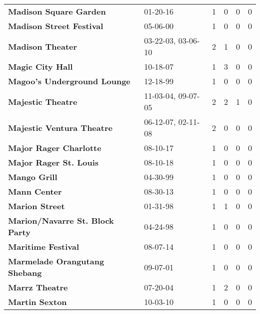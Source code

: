 \begin{supertabular}{p{0.4\textwidth}p{0.3\textwidth}p{0.05\textwidth}p{0.05\textwidth}p{0.05\textwidth}p{0.05\textwidth}}
                                       \textbf{Madison Square Garden} &            01-20-16 &  1 &  0 &  0 &  0 \\
                                     \textbf{Madison Street Festival} &            05-06-00 &  1 &  0 &  0 &  0 \\
                                             \textbf{Madison Theater} &  03-22-03, 03-06-10 &  2 &  1 &  0 &  0 \\
                                             \textbf{Magic City Hall} &            10-18-07 &  1 &  3 &  0 &  0 \\
                                  \textbf{Magoo's Underground Lounge} &            12-18-99 &  1 &  0 &  0 &  0 \\
                                            \textbf{Majestic Theatre} &  11-03-04, 09-07-05 &  2 &  2 &  1 &  0 \\
                                    \textbf{Majestic Ventura Theatre} &  06-12-07, 02-11-08 &  2 &  0 &  0 &  0 \\
                                       \textbf{Major Rager Charlotte} &            08-10-17 &  1 &  0 &  0 &  0 \\
                                       \textbf{Major Rager St. Louis} &            08-10-18 &  1 &  0 &  0 &  0 \\
                                                 \textbf{Mango Grill} &            04-30-99 &  1 &  0 &  0 &  0 \\
                                                 \textbf{Mann Center} &            08-30-13 &  1 &  0 &  0 &  0 \\
                                               \textbf{Marion Street} &            01-31-98 &  1 &  1 &  0 &  0 \\
                              \textbf{Marion/Navarre St. Block Party} &            04-24-98 &  1 &  0 &  0 &  0 \\
                                           \textbf{Maritime Festival} &            08-07-14 &  1 &  0 &  0 &  0 \\
                                \textbf{Marmelade Orangutang Shebang} &            09-07-01 &  1 &  0 &  0 &  0 \\
                                               \textbf{Marrz Theatre} &            07-20-04 &  1 &  2 &  0 &  0 \\
                                               \textbf{Martin Sexton} &            10-03-10 &  1 &  0 &  0 &  0 \\

\end{supertabular}
